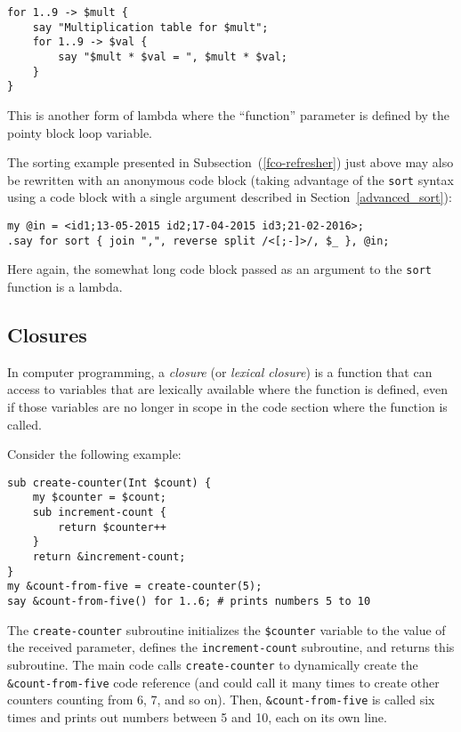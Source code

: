 \begin{verbatim}
for 1..9 -> $mult {
    say "Multiplication table for $mult";
    for 1..9 -> $val {
        say "$mult * $val = ", $mult * $val;
    }
}
\end{verbatim}

This is another form of lambda where the ``function'' 
parameter is defined by the pointy block loop variable.

The sorting example presented in Subsection~(\ref{fco-refresher}) 
just above may also be rewritten with an 
anonymous code block (taking advantage of the {\tt sort} 
syntax using a code block with a single argument described 
in Section~\ref{advanced_sort}):
\begin{verbatim}
my @in = <id1;13-05-2015 id2;17-04-2015 id3;21-02-2016>;
.say for sort { join ",", reverse split /<[;-]>/, $_ }, @in;
\end{verbatim}

Here again, the somewhat long code block passed as an 
argument to the {\tt sort} function is a lambda.

\subsection{Closures}

In computer programming, a \emph{closure} (or \emph{lexical 
closure}) is a function that can access to variables that 
are lexically available where the function is defined, even 
if those variables are no longer in scope in the code section 
where the function is called.

Consider the following example:

\begin{verbatim}
sub create-counter(Int $count) {
    my $counter = $count;
    sub increment-count {
        return $counter++
    }
    return &increment-count;
}
my &count-from-five = create-counter(5);
say &count-from-five() for 1..6; # prints numbers 5 to 10
\end{verbatim}

The {\tt create-counter} subroutine initializes the 
\verb'$counter' variable to the value of the received 
parameter, defines the {\tt increment-count} subroutine, 
and returns this subroutine. The main code calls 
{\tt create-counter} to dynamically create the 
\verb'&count-from-five' code reference (and could 
call it many times to create other counters counting 
from 6, 7, and so on).  Then, \verb'&count-from-five' 
is called six times and prints out numbers between 5 
and 10, each on its own line.

